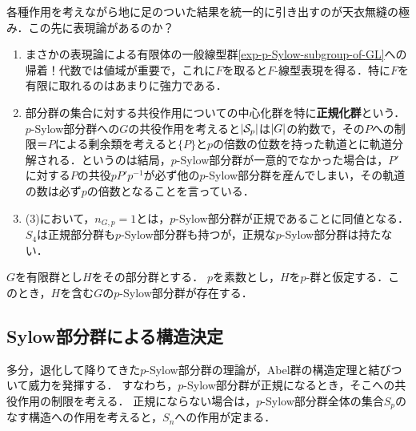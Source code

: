 \documentclass[uplatex,dvipdfmx]{jsreport}
\begin{document}
\begin{remarks}
    各種作用を考えながら地に足のついた結果を統一的に引き出すのが天衣無縫の極み．この先に表現論があるのか？
    \begin{enumerate}
        \item まさかの表現論による有限体の一般線型群\ref{exp-p-Sylow-subgroup-of-GL}への帰着！代数では値域が重要で，これに$F$を取ると$F$-線型表現を得る．特に$F$を有限に取れるのはあまりに強力である．
        \item 部分群の集合に対する共役作用についての中心化群を特に\textbf{正規化群}という．$p$-Sylow部分群への$G$の共役作用を考えると$\lvert\mathcal{S}_p\rvert$は$\lvert G\rvert$の約数で，その$P$への制限＝$P$による剰余類を考えると$\{P\}$と$p$の倍数の位数を持った軌道とに軌道分解される．というのは結局，$p$-Sylow部分群が一意的でなかった場合は，$P'$に対する$P$の共役$pP'p^{-1}$が必ず他の$p$-Sylow部分群を産んでしまい，その軌道の数は必ず$p$の倍数となることを言っている．
        \item (3)において，$n_{G,p}=1$とは，$p$-Sylow部分群が正規であることに同値となる．$S_4$は正規部分群も$p$-Sylow部分群も持つが，正規な$p$-Sylow部分群は持たない．
    \end{enumerate}
\end{remarks}

\begin{corollary}
    $G$を有限群とし$H$をその部分群とする．
    $p$を素数とし，$H$を$p$-群と仮定する．このとき，$H$を含む$G$の$p$-Sylow部分群が存在する．
\end{corollary}

\subsection{Sylow部分群による構造決定}

\begin{tcolorbox}[colframe=ForestGreen, colback=ForestGreen!10!white,breakable,colbacktitle=ForestGreen!40!white,coltitle=black,fonttitle=\bfseries\sffamily,
title=]
    多分，退化して降りてきた$p$-Sylow部分群の理論が，Abel群の構造定理と結びついて威力を発揮する．
    すなわち，$p$-Sylow部分群が正規になるとき，そこへの共役作用の制限を考える．
    正規にならない場合は，$p$-Sylow部分群全体の集合$S_p$のなす構造への作用を考えると，$S_n$への作用が定まる．
\end{tcolorbox}
\end{document}
